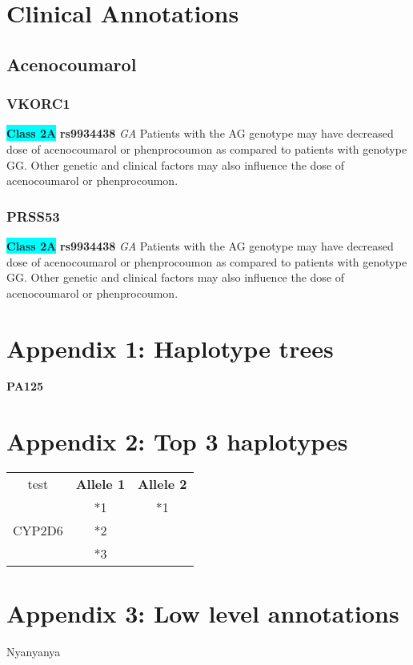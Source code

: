 \documentclass{book}
\begin{document}
\section{Clinical Annotations}

\subsection{Acenocoumarol}
\subsubsection{VKORC1}
\textbf{\colorbox{cyan} {Class 2A}} \textbf{ rs9934438 } \textit{ GA }
Patients with the AG genotype may have decreased dose of acenocoumarol or phenprocoumon as compared to patients with genotype GG. Other genetic and clinical factors may also influence the dose of acenocoumarol or phenprocoumon. 
\subsubsection{PRSS53}
\textbf{\colorbox{cyan} {Class 2A}} \textbf{ rs9934438 } \textit{ GA }
Patients with the AG genotype may have decreased dose of acenocoumarol or phenprocoumon as compared to patients with genotype GG. Other genetic and clinical factors may also influence the dose of acenocoumarol or phenprocoumon. 

\newpage


\section{Appendix 1: Haplotype trees}
\begin{center}
\textbf{PA125}
\begin{newicktree}
\nobranchlengths
\nonodemarkers
\righttree \setunitlength{0.5cm}
\end{newicktree} 
\end{center}

\section{Appendix 2: Top 3 haplotypes}

\begin{tabularx}{\textwidth}{ c c c }
test & \textbf{Allele 1} & \textbf{Allele 2} \\
\multirow{3}{200pt}{CYP2D6} &
\**1 & *1 \\
\**2 & *2 \\
\**3 & *3 \\
\end{tabularx}

\section{Appendix 3: Low level annotations}
Nyanyanya


\end{document}
